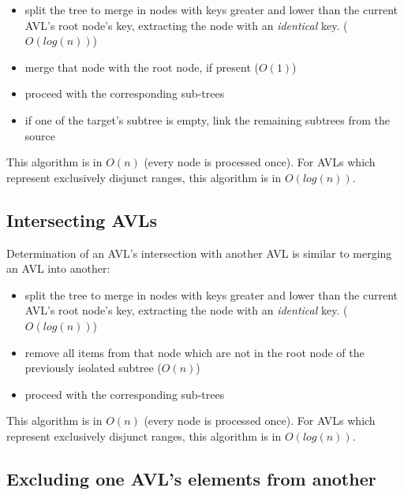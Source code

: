         \begin{itemize}
            \item split the tree to merge in nodes with keys greater and lower
                than the current AVL's root node's key, extracting the node
                with an \emph{identical} key. ($O(log(n))$)
            \item merge that node with the root node, if present ($O(1)$)
            \item proceed with the corresponding sub-trees
            \item if one of the target's subtree is empty, link the remaining
                subtrees from the source
        \end{itemize}

        This algorithm is in $O(n)$ (every node is processed once).
        For AVLs which represent exclusively disjunct ranges, this algorithm
        is in $O(log(n))$.


    \subsection{Intersecting AVLs}
    \label{sec:AVL_ops-intersect}

        Determination of an AVL's intersection with another AVL is similar to
        merging an AVL into another:

        \begin{itemize}
            \item split the tree to merge in nodes with keys greater and lower
                than the current AVL's root node's key, extracting the node
                with an \emph{identical} key. ($O(log(n))$)
            \item remove all items from that node which are not in the root node
                of the previously isolated subtree ($O(n)$)
            \item proceed with the corresponding sub-trees
        \end{itemize}

        This algorithm is in $O(n)$ (every node is processed once).
        For AVLs which represent exclusively disjunct ranges, this algorithm
        is in $O(log(n))$.


    \subsection{Excluding one AVL's elements from another}
    \label{sec:AVL_ops-exclude}

